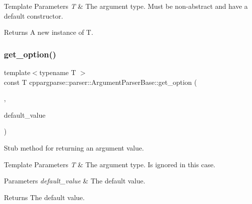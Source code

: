 \begin{DoxyTemplParams}{Template Parameters}
{\em T} & The argument type. Must be non-\/abstract and have a default constructor.\\
\hline
\end{DoxyTemplParams}
\begin{DoxyReturn}{Returns}
A new instance of T. 
\end{DoxyReturn}
\mbox{\label{classcppargparse_1_1parser_1_1ArgumentParserBase_ad482db4f4cfafdd0a754d32dd3e36e51}} 
\subsubsection{\texorpdfstring{get\+\_\+option()}{get\_option()}\hspace{0.1cm}{\footnotesize\ttfamily [2/2]}}
{\footnotesize\ttfamily template$<$typename T $>$ \\
const T cppargparse\+::parser\+::\+Argument\+Parser\+Base\+::get\+\_\+option (\begin{DoxyParamCaption}\item[{const std\+::string \&}]{,  }\item[{const T \&}]{default\+\_\+value }\end{DoxyParamCaption})\hspace{0.3cm}{\ttfamily [inline]}}



Stub method for returning an argument value. 


\begin{DoxyTemplParams}{Template Parameters}
{\em T} & The argument type. Is ignored in this case.\\
\hline
\end{DoxyTemplParams}

\begin{DoxyParams}{Parameters}
{\em default\+\_\+value} & The default value.\\
\hline
\end{DoxyParams}
\begin{DoxyReturn}{Returns}
The default value. 
\end{DoxyReturn}
\mbox{\label{classcppargparse_1_1parser_1_1ArgumentParserBase_af99c2847a2cd19b1444dcb9ab2fb8103}} 
